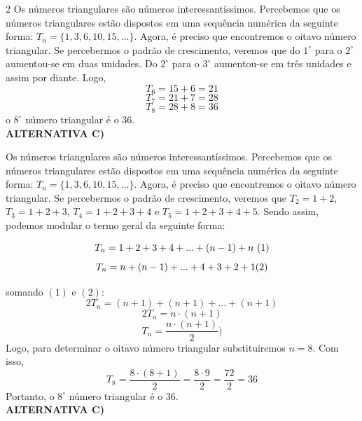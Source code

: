 \begin{solucoes}{2}
    \solucao 
Os números triangulares são números interessantíssimos. Percebemos que os números triangulares estão dispostos em uma sequência numérica da seguinte forma: $T_n=\{1,3,6,10,15,...\}$. Agora, é preciso que encontremos o oitavo número triangular. Se percebermos o padrão de crescimento, veremos que do $1^\circ$ para o $2^\circ$ aumentou-se em duas unidades. Do $2^\circ$ para o $3^\circ$ aumentou-se em três unidades e assim por diante. Logo,
        \begin{equation*}
        T_6=15+6=21
        \end{equation*}
         \begin{equation*}
        T_7=21+7=28
        \end{equation*}
         \begin{equation*}
        T_8=28+8=36
        \end{equation*}
        o $8^\circ$ número triangular é o 36. \\
    \textbf{ALTERNATIVA C)}

    \solucao
    Os números triangulares são números interessantíssimos. Percebemos que os números triangulares estão dispostos em uma sequência numérica da seguinte forma: $T_n=\{1,3,6,10,15,...\}$. Agora, é preciso que encontremos o oitavo número triangular. Se percebermos o padrão de crescimento, veremos que $T_2=1+2$, $T_3=1+2+3$, $T_4=1+2+3+4$ e $T_5=1+2+3+4+5$. Sendo assim, podemos modular o termo geral da seguinte forma:
        
        \begin{equation*}
        T_n=1+2+3+4+...+(n-1)+n \\\\\\\ (1)
        \end{equation*}
        \begin{equation*}
        T_n=n+(n-1)+...+4+3+2+1 \\\\ (2)
 \end{equation*}
        
        somando $(1)$ e $(2)$:
        \begin{equation*}
        2T_n=(n+1)+(n+1)+...+(n+1)
        \end{equation*}
        \begin{equation*}
        2T_n=n\cdot(n+1)
        \end{equation*}
        \begin{equation*}
        T_n=\frac{n\cdot(n+1)}{2})
        \end{equation*}
        Logo, para determinar o oitavo número triangular substituiremos $n=8$. Com isso, 
        \begin{equation*}
            T_8=\frac{8\cdot(8+1)}{2}=\frac{8\cdot 9}{2}=\frac{72}{2}=36
        \end{equation*}
        Portanto, o $8^\circ$ número triangular é o 36. \\
    \textbf{ALTERNATIVA C)}
\end{solucoes}

